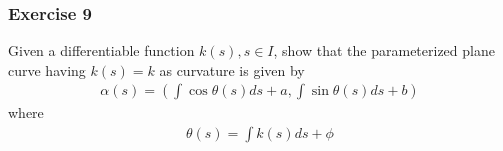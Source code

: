 \documentclass{article}
\begin{document}
	
	\subsubsection*{Exercise 9}
	Given a differentiable function $k(s), s \in I$, show that the parameterized plane curve having $k(s) = k$ as curvature is given by
	\begin{gather*}
		\alpha(s) = \left( \int \cos \theta(s) ds + a, \int \sin \theta(s) ds + b \right)
	\end{gather*}
	where
	\begin{gather*}
		\theta(s) = \int k(s) ds + \phi
	\end{gather*}
	
\end{document}

